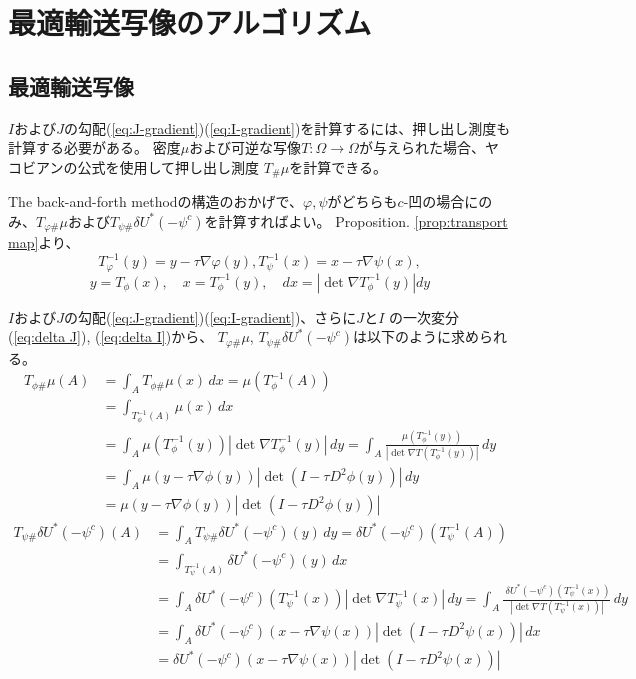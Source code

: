 \chapter{最適輸送写像のアルゴリズム}
\label{ch:optmap_algorithm}
\section{最適輸送写像}
\label{sect:最適輸送写像}

$I$および$J$の勾配(\ref{eq:J-gradient})(\ref{eq:I-gradient})を計算するには、押し出し測度も計算する必要がある。
密度$\mu$および可逆な写像$T: \Omega \to \Omega$が与えられた場合、ヤコビアンの公式を使用して押し出し測度 $T_\# \mu$を計算できる。

The back-and-forth methodの構造のおかげで、$\varphi, \psi$がどちらも$c$-凹の場合にのみ、$T_{\varphi \#} \mu$および$T_{\psi \#} \delta U^*(- \psi^c)$を計算すればよい。
Proposition. \ref{prop:transport map}より、
\[
    T_\varphi ^{-1}(y) = y - \tau \nabla \varphi(y), T_\psi^{-1}(x) = x - \tau \nabla \psi(x),
\]
\[
    y = T_\phi(x), \quad x = T^{-1}_\phi (y), \quad dx = |\det \nabla T^{-1}_\phi (y)| dy 
\]

$I$および$J$の勾配(\ref{eq:J-gradient})(\ref{eq:I-gradient})、さらに$J$と$I$ の一次変分(\ref{eq:delta J}), (\ref{eq:delta I})から、
$T_{\varphi \#} \mu$, $T_{\psi \#} \delta U^*(- \psi^c)$は以下のように求められる。
\begin{align*}
    T_{\phi \#} \mu (A) &= \int_A T_{\phi \#} \mu (x)\, dx = \mu(T^{-1}_\phi (A))\\
                        &= \int_{T^{-1}_\phi (A)} \mu(x) \, dx\\
                        &= \int_A \mu \left( T^{-1}_\phi(y) \right) |\det \nabla T^{-1}_\phi (y)|\, dy = \int_A \frac{\mu \left( T^{-1}_\phi(y) \right)}{|\det \nabla T\left(T^{-1}_\phi (y)\right)|}\, dy\\
                        &= \int_A \mu(y - \tau \nabla \phi(y))|\det (I - \tau D^2 \phi(y))|\, dy\\
                        &= \mu(y - \tau \nabla \phi(y))|\det (I - \tau D^2 \phi(y))|
\end{align*}
\begin{align*}
    T_{\psi \#} \delta U^* (- \psi^c) (A)   &= \int_A T_{\psi \#} \delta U^* (- \psi^c) (y)\, dy =  \delta U^* (- \psi^c)(T^{-1}_\psi (A))\\
                                            &= \int_{T^{-1}_\psi (A)} \delta U^* (- \psi^c) (y) \, dx\\
                                            &= \int_A  \delta U^* (- \psi^c)  \left(T^{-1}_\psi (x) \right) |\det \nabla T^{-1}_\psi (x)|\, dy = \int_A \frac{\ \delta U^* (- \psi^c)  \left( T^{-1}_\psi(x) \right)}{|\det \nabla T\left(T^{-1}_\psi (x)\right)|}\, dy\\
                                            &= \int_A \delta U^* (- \psi^c)(x - \tau \nabla \psi(x))|\det (I - \tau D^2 \psi(x))|\, dx\\
                                            &= \delta U^* (- \psi^c)(x - \tau \nabla \psi(x))|\det (I - \tau D^2 \psi(x))|
\end{align*}

